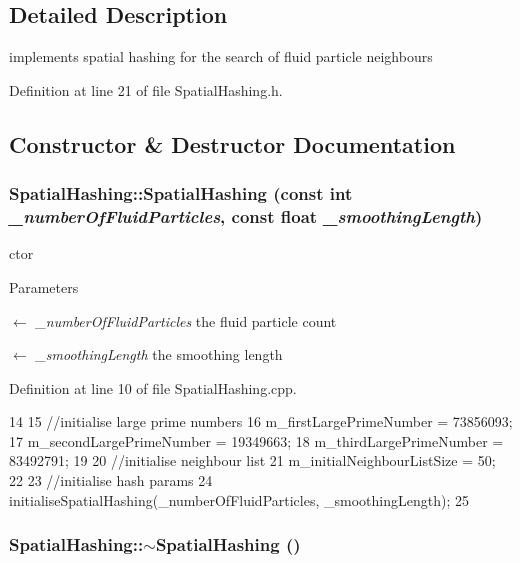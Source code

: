 \subsection{Detailed Description}
implements spatial hashing for the search of fluid particle neighbours 

Definition at line 21 of file SpatialHashing.h.



\subsection{Constructor \& Destructor Documentation}
\hypertarget{class_spatial_hashing_a98c165ee367f6fbd6a755bcdd46e0d98}{
\subsubsection[{SpatialHashing}]{\setlength{\rightskip}{0pt plus 5cm}SpatialHashing::SpatialHashing (const int {\em \_\-numberOfFluidParticles}, \/  const float {\em \_\-smoothingLength})}}
\label{class_spatial_hashing_a98c165ee367f6fbd6a755bcdd46e0d98}


ctor 


\begin{DoxyParams}{Parameters}
\item[\mbox{$\leftarrow$} {\em \_\-numberOfFluidParticles}]the fluid particle count \item[\mbox{$\leftarrow$} {\em \_\-smoothingLength}]the smoothing length \end{DoxyParams}


Definition at line 10 of file SpatialHashing.cpp.




\begin{DoxyCode}
14 {
15     //initialise large prime numbers
16     m_firstLargePrimeNumber = 73856093;
17     m_secondLargePrimeNumber = 19349663;
18     m_thirdLargePrimeNumber = 83492791;
19 
20     //initialise neighbour list
21     m_initialNeighbourListSize = 50;
22 
23     //initialise hash params
24     initialiseSpatialHashing(_numberOfFluidParticles, _smoothingLength);
25 }
\end{DoxyCode}


\hypertarget{class_spatial_hashing_a5799e4a0ffdbd11c5202aa13d15dc313}{
\subsubsection[{$\sim$SpatialHashing}]{\setlength{\rightskip}{0pt plus 5cm}SpatialHashing::$\sim$SpatialHashing ()}}
\label{class_spatial_hashing_a5799e4a0ffdbd11c5202aa13d15dc313}


